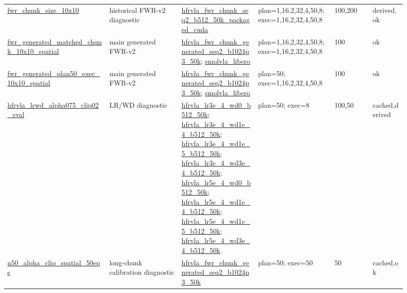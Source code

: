 \begin{scriptsize}
\begin{longtable}{@{}p{0.24\linewidth}p{0.17\linewidth}p{0.18\linewidth}p{0.18\linewidth}p{0.09\linewidth}p{0.08\linewidth}@{}}
\url{fwr_chunk_size_10x10} & historical FWR-v2 diagnostic & \url{hfrvla_fwr_chunk_seq2_b512_50k_packaged_cuda} & plan=1,16,2,32,4,50,8; exec=1,16,2,32,4,50,8 & 100,200 & derived,ok \\
\url{fwr_generated_matched_chunk_10x10_spatial} & main generated FWR-v2 & \url{hfrvla_fwr_chunk_generated_seq2_b1024p3_50k}; \url{smolvla_libero} & plan=1,16,2,32,4,50,8; exec=1,16,2,32,4,50,8 & 100 & ok \\
\url{fwr_generated_plan50_exec_10x10_spatial} & main generated FWR-v2 & \url{hfrvla_fwr_chunk_generated_seq2_b1024p3_50k}; \url{smolvla_libero} & plan=50; exec=1,16,2,32,4,50,8 & 100 & ok \\
\url{hfrvla_lrwd_alpha075_clip02_eval} & LR/WD diagnostic & \url{hfrvla_lr3e_4_wd0_b512_50k}; \url{hfrvla_lr3e_4_wd1e_4_b512_50k}; \url{hfrvla_lr3e_4_wd1e_5_b512_50k}; \url{hfrvla_lr3e_4_wd3e_4_b512_50k}; \url{hfrvla_lr5e_4_wd0_b512_50k}; \url{hfrvla_lr5e_4_wd1e_4_b512_50k}; \url{hfrvla_lr5e_4_wd1e_5_b512_50k}; \url{hfrvla_lr5e_4_wd3e_4_b512_50k} & plan=50; exec=8 & 100,50 & cached,derived \\
\url{n50_alpha_clip_spatial_50eps} & long-chunk calibration diagnostic & \url{hfrvla_fwr_chunk_generated_seq2_b1024p3_50k} & plan=50; exec=50 & 50 & cached,ok \\
\end{longtable}
\end{scriptsize}


